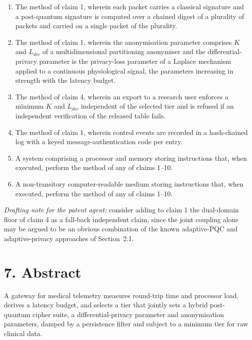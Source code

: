 \documentclass[11pt,a4paper]{article}
\begin{document}
\begin{enumerate}[leftmargin=*,label=\textbf{\arabic*.}]
\item The method of claim 1, wherein each packet carries a classical signature and a post-quantum signature is computed over a chained digest of a plurality of packets and carried on a single packet of the plurality.
\item The method of claim 1, wherein the anonymisation parameter comprises $K$ and $L_{div}$ of a multidimensional partitioning anonymiser and the differential-privacy parameter is the privacy-loss parameter of a Laplace mechanism applied to a continuous physiological signal, the parameters increasing in strength with the latency budget.
\item The method of claim 4, wherein an export to a research user enforces a minimum $K$ and $L_{div}$ independent of the selected tier and is refused if an independent verification of the released table fails.
\item The method of claim 1, wherein control events are recorded in a hash-chained log with a keyed message-authentication code per entry.
\item A system comprising a processor and memory storing instructions that, when executed, perform the method of any of claims 1--10.
\item A non-transitory computer-readable medium storing instructions that, when executed, perform the method of any of claims 1--10.
\end{enumerate}

\noindent\textit{Drafting note for the patent agent:} consider adding to claim 1 the dual-domain floor of claim 4 as a fall-back independent claim, since the joint coupling alone may be argued to be an obvious combination of the known adaptive-PQC and adaptive-privacy approaches of Section~2.1.

\section*{7. Abstract}
A gateway for medical telemetry measures round-trip time and processor load, derives a latency budget, and selects a tier that jointly sets a hybrid post-quantum cipher suite, a differential-privacy parameter and anonymisation parameters, damped by a persistence filter and subject to a minimum tier for raw clinical data.
\end{document}
